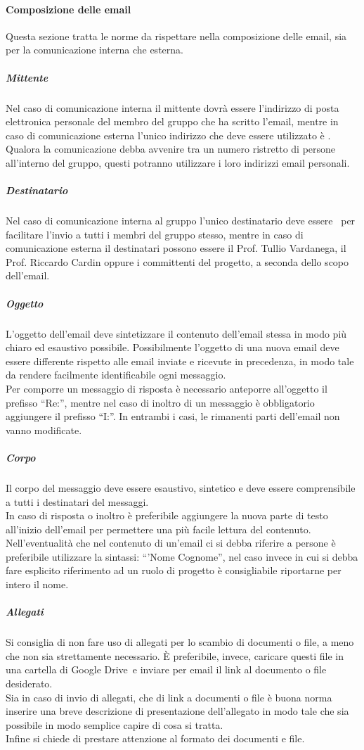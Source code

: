 \documentclass[../NormeProgetto.tex]{subfiles}
\begin{document}
			\paragraph{Composizione delle email}
			Questa sezione tratta le norme da rispettare nella composizione delle email, sia per la comunicazione interna che esterna.
			\subparagraph{Mittente}
			Nel caso di comunicazione interna il mittente dovrà essere l'indirizzo di posta elettronica personale del membro del gruppo che ha scritto l'email, mentre in caso di comunicazione esterna l'unico indirizzo che deve essere utilizzato è \mailleaf. \\ Qualora la comunicazione debba avvenire tra un numero ristretto di persone all'interno del gruppo, questi potranno utilizzare i loro indirizzi email personali.
			\subparagraph{Destinatario}
			Nel caso di comunicazione interna al gruppo l'unico destinatario deve essere \mailleaf\ per facilitare l'invio a tutti i membri del gruppo stesso, mentre in caso di comunicazione esterna il destinatari possono essere il Prof. Tullio Vardanega, il Prof. Riccardo Cardin oppure i committenti del progetto, a seconda dello scopo dell'email.
			\subparagraph{Oggetto}
			L'oggetto dell'email deve sintetizzare il contenuto dell'email stessa in modo più chiaro ed esaustivo possibile. Possibilmente l'oggetto di una nuova email deve essere differente rispetto alle email inviate e ricevute in precedenza, in modo tale da rendere facilmente identificabile ogni messaggio. \\ Per comporre un messaggio di risposta è necessario anteporre all'oggetto il prefisso ``Re:'', mentre nel caso di inoltro di un messaggio è obbligatorio aggiungere il prefisso ``I:''. In entrambi i casi, le rimanenti parti dell'email non vanno modificate.
			\subparagraph{Corpo}
			Il corpo del messaggio deve essere esaustivo, sintetico e deve essere comprensibile a tutti i destinatari del messaggi. \\ In caso di risposta o inoltro è preferibile aggiungere la nuova parte di testo all'inizio dell'email per permettere una più facile lettura del contenuto. \\ Nell'eventualità che nel contenuto di un'email ci si debba riferire a persone è preferibile utilizzare la sintassi: ``'Nome Cognome'', nel caso invece in cui si debba fare esplicito riferimento ad un ruolo di progetto è consigliabile riportarne per intero il nome.
			\subparagraph{Allegati}
			Si consiglia di non fare uso di allegati per lo scambio di documenti o file, a meno che non sia strettamente necessario. È preferibile, invece, caricare questi file in una cartella di Google Drive\g\ e inviare per email il link al documento o file desiderato. \\ Sia in caso di invio di allegati, che di link a documenti o file è buona norma inserire una breve descrizione di presentazione dell'allegato in modo tale che sia possibile in modo semplice capire di cosa si tratta. \\ Infine si chiede di prestare attenzione al formato dei documenti e file.
\end{document}
